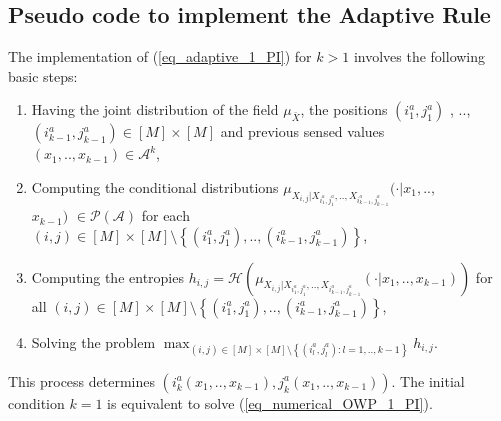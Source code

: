 {
\subsection{Pseudo code to implement the Adaptive Rule}
\label{sub_sec_pseudo_actives_sensing_PI}
The implementation of (\ref{eq_adaptive_1_PI}) for $k>1$ involves the following basic steps:
}

{
\begin{enumerate}
	\item Having the joint distribution of the field $\mu_{\bar{X}}$, the positions $(i^a_1,j^a_1)$ , $..$, $(i^a_{k-1},j^a_{k-1})\in [M]\times [M]$ and previous sensed values $(x_1,..,x_{k-1}) \in \mathcal{A}^k$,
	\item Computing the conditional distributions $\mu_{X_{i,j}| X_{i^a_1,j^a_1},..,X_{i^a_{k-1},j^a_{k-1}}}(\cdot | x_1,..,$ \\ $x_{k-1}) $ $ \in \mathcal{P}(\mathcal{A})$ for each $(i,j)\in [M]\times [M] \setminus \left\{ (i^a_1,j^a_1),..,(i^a_{k-1},j^a_{k-1}) \right\}$,
	\item Computing the entropies $h_{i,j}=\mathcal{H}(\mu_{X_{i,j}| X_{i^a_1,j^a_1},..,X_{i^a_{k-1},j^a_{k-1}}}(\cdot | x_1,..,x_{k-1}))$ for all $(i,j) \in [M]\times [M] \setminus \left\{ (i^a_1,j^a_1),..,(i^a_{k-1},j^a_{k-1}) \right\}$,
	\item Solving the problem $\max_{(i,j)\in [M]\times [M] \setminus \left\{(i^a_l,j^a_l): l=1,..,k-1\right\}} h_{i,j}$.
\end{enumerate}
This process determines $(i^a_k(x_1,..,x_{k-1}),j^a_k(x_1,..,x_{k-1}))$. The initial condition $k=1$ is equivalent to solve (\ref{eq_numerical_OWP_1_PI}).
}

